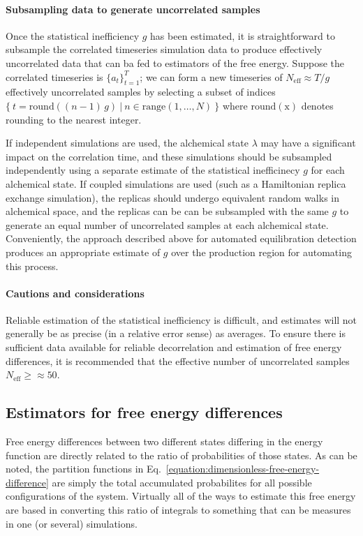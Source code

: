 \documentclass[9pt,bestpractices]{livecoms}
\begin{document}
\paragraph{Subsampling data to generate uncorrelated samples}
Once the statistical inefficiency $g$ has been estimated, it is straightforward to subsample the correlated timeseries simulation data to produce effectively uncorrelated data that can ba fed to estimators of the free energy.
Suppose the correlated timeseries is $\{a_t\}_{t=1}^T$; we can form a new timeseries of $N_{\mathrm{eff}} \approx T / g$ effectively uncorrelated samples by selecting a subset of indices $\{ \: t = \mathrm{round}((n-1) \, g) \: | \: n \in \mathrm{range}(1,\ldots ,N) \: \}$ where $\mathrm{round(x)}$ denotes rounding to the nearest integer.

If independent simulations are used, the alchemical state $\lambda$ may have a significant impact on the correlation time, and these simulations should be subsampled independently using a separate estimate of the statistical inefficinecy $g$ for each alchemical state.
If coupled simulations are used (such as a Hamiltonian replica exchange simulation), the replicas should undergo equivalent random walks in alchemical space, and the replicas can be can be subsampled with the same $g$ to generate an equal number of uncorrelated samples at each alchemical state.
Conveniently, the approach described above for automated equilibration detection produces an appropriate estimate of $g$ over the production region for automating this process.

\paragraph{Cautions and considerations}
Reliable estimation of the statistical inefficiency is difficult, and estimates will not generally be as precise (in a relative error sense) as averages.
To ensure there is sufficient data available for reliable decorrelation and estimation of free energy differences, it is recommended that the effective number of uncorrelated samples $N_{\mathrm{eff}} \ge \approx 50$.

\subsection*{Estimators for free energy differences}

Free energy differences between two different states differing in the energy function are directly related to the
ratio of probabilities of those states.
As can be noted, the partition functions in Eq.~\ref{equation:dimensionless-free-energy-difference} are simply the total accumulated probabilites for all possible configurations of the system. Virtually all of the ways to estimate this free energy are based in converting this ratio of integrals to something that can be measures in one (or several) simulations.  
\end{document}
